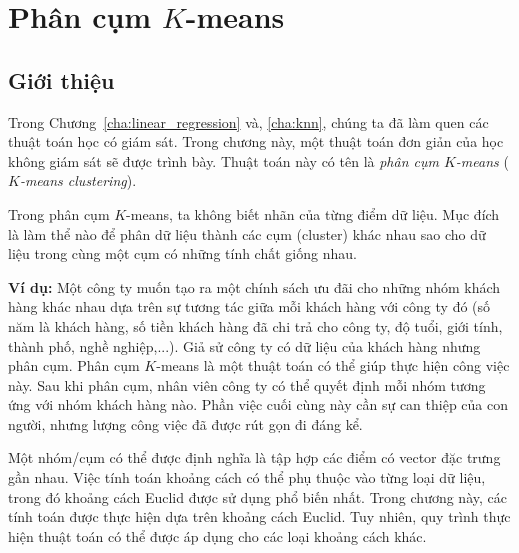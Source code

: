 \chapter{Phân cụm $K$-means}
\label{cha:kmeans}
\section{Giới thiệu}
Trong Chương~\ref{cha:linear_regression} và, \ref{cha:knn}, chúng ta đã làm quen
các thuật toán học có giám sát. Trong chương này, một thuật toán đơn giản của
học không giám sát sẽ được trình bày. Thuật toán này có tên là \textit{phân cụm
$K$-means} (\textit{$K$-means clustering}).

Trong phân cụm $K$-means, ta không biết nhãn của từng
điểm dữ liệu. Mục đích là làm thể nào để phân dữ liệu thành các cụm (cluster)
khác nhau sao cho dữ liệu trong cùng một cụm có những tính chất giống nhau.

\textbf{Ví dụ:} Một công ty muốn tạo ra một chính sách ưu đãi cho những nhóm
khách hàng khác nhau dựa trên sự tương tác giữa mỗi khách hàng với công ty đó
(số năm là khách hàng, số tiền khách hàng đã chi trả cho công ty, độ tuổi, giới
tính, thành phố, nghề nghiệp,...). Giả sử công ty có dữ liệu của khách hàng
nhưng phân cụm. Phân cụm $K$-means là một thuật toán có thể giúp thực hiện
công việc này. Sau khi phân cụm, nhân viên công ty có thể quyết định mỗi
nhóm tương ứng với nhóm khách hàng nào. Phần việc cuối cùng này cần sự can thiệp
của con người, nhưng lượng công việc đã được rút gọn đi đáng kể.


Một nhóm/cụm có thể được định nghĩa là tập hợp các điểm có
vector đặc trưng gần nhau. Việc tính toán khoảng cách có thể phụ thuộc vào từng loại dữ liệu, trong đó khoảng cách Euclid được sử dụng phổ biến nhất. Trong chương này, các tính toán được thực hiện dựa trên khoảng cách Euclid. Tuy nhiên, quy trình thực hiện thuật toán có thể được áp dụng cho các loại khoảng cách khác. 

